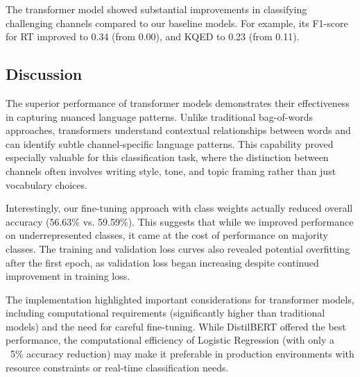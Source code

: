 \documentclass[11pt]{article}
\begin{document}
The transformer model showed substantial improvements in classifying challenging channels compared to our baseline models. For example, its F1-score for RT improved to 0.34 (from 0.00), and KQED to 0.23 (from 0.11).

\subsection{Discussion}

The superior performance of transformer models demonstrates their effectiveness in capturing nuanced language patterns. Unlike traditional bag-of-words approaches, transformers understand contextual relationships between words and can identify subtle channel-specific language patterns. This capability proved especially valuable for this classification task, where the distinction between channels often involves writing style, tone, and topic framing rather than just vocabulary choices.

Interestingly, our fine-tuning approach with class weights actually reduced overall accuracy (56.63\% vs. 59.59\%). This suggests that while we improved performance on underrepresented classes, it came at the cost of performance on majority classes. The training and validation loss curves also revealed potential overfitting after the first epoch, as validation loss began increasing despite continued improvement in training loss.

The implementation highlighted important considerations for transformer models, including computational requirements (significantly higher than traditional models) and the need for careful fine-tuning. While DistilBERT offered the best performance, the computational efficiency of Logistic Regression (with only a ~5\% accuracy reduction) may make it preferable in production environments with resource constraints or real-time classification needs.
\end{document}
